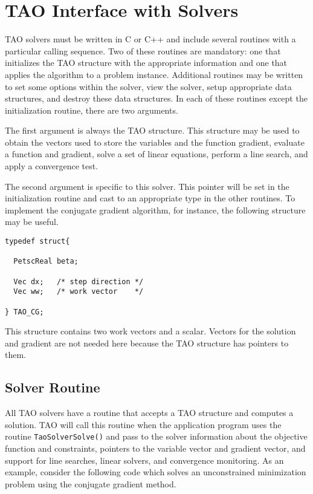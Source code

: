 \section{TAO Interface with Solvers}
TAO solvers must be written in C or C++ and include several routines with
a particular calling sequence.  Two of these routines are mandatory:
one that initializes the TAO structure with the appropriate information
and one that applies the algorithm to a problem instance.
Additional routines may be written to set some options within the
solver, view the solver, setup appropriate data structures, and destroy
these data structures.
In each of these routines except the initialization routine, 
there are two arguments.  

The first argument
is always the TAO structure.  This structure may be used to obtain the
vectors used to store the variables and the function gradient, evaluate
a function and gradient, solve a set of linear equations, perform a line 
search, and apply a convergence test.

The second argument is specific to this solver.  This pointer will be set
in  the initialization routine and cast to an appropriate type in
the other routines.  To implement the conjugate
gradient algorithm, for instance, the following structure may
be useful.
\begin{verbatim}
typedef struct{

  PetscReal beta;

  Vec dx;   /* step direction */
  Vec ww;   /* work vector    */

} TAO_CG;
\end{verbatim}
This structure contains two work vectors and a scalar.  Vectors
for the solution and gradient are not needed here because the TAO
structure has pointers to them.

\subsection{Solver Routine}
All TAO solvers have a routine that accepts a TAO structure and
computes a solution.  
TAO will call this routine when the application
program uses the routine {\tt TaoSolverSolve()} and pass to the solver
information
about the objective function and constraints, pointers to the
variable vector and gradient vector, and support for line searches,
linear solvers, and convergence monitoring.  As an example, consider
the following code which solves an unconstrained minimization problem
using the conjugate gradient method.

